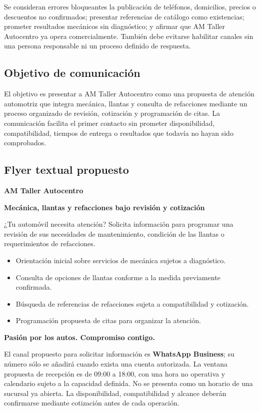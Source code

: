 {Se consideran errores bloqueantes la publicación de teléfonos, domicilios, precios o descuentos no confirmados; presentar referencias de catálogo como existencias; prometer resultados mecánicos sin diagnóstico; y afirmar que AM Taller Autocentro ya opera comercialmente. También debe evitarse habilitar canales sin una persona responsable ni un proceso definido de respuesta.

\subsection{Objetivo de comunicación}

El objetivo es presentar a AM Taller Autocentro como una propuesta de atención automotriz que integra mecánica, llantas y consulta de refacciones mediante un proceso organizado de revisión, cotización y programación de citas. La comunicación facilita el primer contacto sin prometer disponibilidad, compatibilidad, tiempos de entrega o resultados que todavía no hayan sido comprobados.

\subsection{Flyer textual propuesto}

\textbf{AM Taller Autocentro}

\textbf{Mecánica, llantas y refacciones bajo revisión y cotización}

¿Tu automóvil necesita atención? Solicita información para programar una revisión de sus necesidades de mantenimiento, condición de las llantas o requerimientos de refacciones.

\begin{itemize}
    \item Orientación inicial sobre servicios de mecánica sujetos a diagnóstico.
    \item Consulta de opciones de llantas conforme a la medida previamente confirmada.
    \item Búsqueda de referencias de refacciones sujeta a compatibilidad y cotización.
    \item Programación propuesta de citas para organizar la atención.
\end{itemize}

\textbf{Pasión por los autos. Compromiso contigo.}

El canal propuesto para solicitar información es \textbf{WhatsApp Business}; su número sólo se añadirá cuando exista una cuenta autorizada. La ventana propuesta de recepción es de 09:00 a 18:00, con una hora no operativa y calendario sujeto a la capacidad definida. No se presenta como un horario de una sucursal ya abierta. La disponibilidad, compatibilidad y alcance deberán confirmarse mediante cotización antes de cada operación.

}
